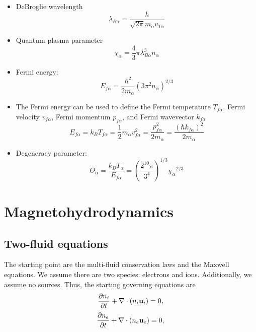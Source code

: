 \documentclass[a4paper,11pt]{report}
\begin{document}
\begin{itemize}
    \item DeBroglie wavelength
    \begin{equation}
        \lambda_{B\alpha} = \dfrac{h}{\sqrt{2 \pi} m_\alpha v_{T\alpha}}
    \end{equation}
    \item Quantum plasma parameter
    \begin{equation}
        \chi_\alpha = \frac{4}{3} \pi \lambda_{B\alpha}^3 n_\alpha
    \end{equation}
    
    \item Fermi energy:
    \begin{equation}
        E_{f\alpha} = \frac{\hbar^2}{2m_\alpha} \left ( 3 \pi^2 n_\alpha \right)^{2/3}
    \end{equation}

    \item The Fermi energy can be used to define the Fermi temperature $T_{f\alpha}$, Fermi velocity $v_{f\alpha}$, Fermi momentum $p_{f\alpha}$, and Fermi wavevector $k_{f\alpha}$
    \begin{equation}
        E_{f\alpha} = k_B T_{f\alpha} = \frac{1}{2} m_\alpha v_{f\alpha}^2  = \frac{p_{f\alpha}^2}{2m_\alpha} = \frac{\left ( \hbar k_{f\alpha} \right ) ^2}{2m_\alpha}
    \end{equation}

    \item Degeneracy parameter:
    \begin{equation}
        \Theta_\alpha = \frac{k_B T_\alpha}{E_{f\alpha}} = \left( \frac{2^{10} \pi}{3^4} \right)^{1/3} \chi_\alpha^{-2/3}
    \end{equation}
\end{itemize}

\chapter{Magnetohydrodynamics}
\section{Two-fluid equations}
\label{sec:two_fluid_equations}
The starting point are the multi-fluid conservation laws and the Maxwell equations. We assume there are two species: electrons and ions. Additionally, we assume no sources. Thus, the starting governing equations are
\begin{equation}
\label{eq:twof_ni}
    \frac{\partial n_i}{\partial t} + \nabla \cdot \left ( n_i \mathbf{u}_i \right ) = 0,
\end{equation}
\begin{equation}
\label{eq:twof_ne}
    \frac{\partial n_e}{\partial t} + \nabla \cdot \left ( n_e \mathbf{u}_e \right ) = 0,
\end{equation}
\end{document}
